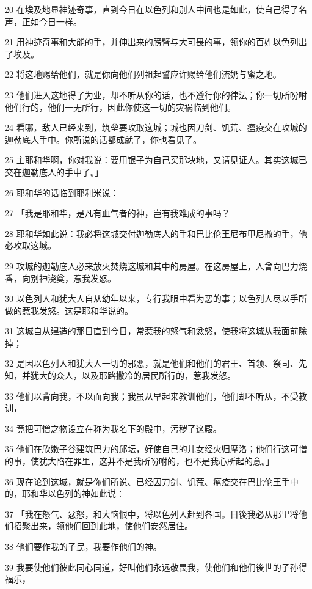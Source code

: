 \par 20 在埃及地显神迹奇事，直到今日在以色列和别人中间也是如此，使自己得了名声，正如今日一样。
\par 21 用神迹奇事和大能的手，并伸出来的膀臂与大可畏的事，领你的百姓以色列出了埃及。
\par 22 将这地赐给他们，就是你向他们列祖起誓应许赐给他们流奶与蜜之地。
\par 23 他们进入这地得了为业，却不听从你的话，也不遵行你的律法；你一切所吩咐他们行的，他们一无所行，因此你使这一切的灾祸临到他们。
\par 24 看哪，敌人已经来到，筑垒要攻取这城；城也因刀剑、饥荒、瘟疫交在攻城的迦勒底人手中。你所说的话都成就了，你也看见了。
\par 25 主耶和华啊，你对我说：要用银子为自己买那块地，又请见证人。其实这城已交在迦勒底人的手中了。」
\par 26 耶和华的话临到耶利米说：
\par 27 「我是耶和华，是凡有血气者的神，岂有我难成的事吗？
\par 28 耶和华如此说：我必将这城交付迦勒底人的手和巴比伦王尼布甲尼撒的手，他必攻取这城。
\par 29 攻城的迦勒底人必来放火焚烧这城和其中的房屋。在这房屋上，人曾向巴力烧香，向别神浇奠，惹我发怒。
\par 30 以色列人和犹大人自从幼年以来，专行我眼中看为恶的事；以色列人尽以手所做的惹我发怒。这是耶和华说的。
\par 31 这城自从建造的那日直到今日，常惹我的怒气和忿怒，使我将这城从我面前除掉；
\par 32 是因以色列人和犹大人一切的邪恶，就是他们和他们的君王、首领、祭司、先知，并犹大的众人，以及耶路撒冷的居民所行的，惹我发怒。
\par 33 他们以背向我，不以面向我；我虽从早起来教训他们，他们却不听从，不受教训，
\par 34 竟把可憎之物设立在称为我名下的殿中，污秽了这殿。
\par 35 他们在欣嫩子谷建筑巴力的邱坛，好使自己的儿女经火归摩洛；他们行这可憎的事，使犹大陷在罪里，这并不是我所吩咐的，也不是我心所起的意。」
\par 36 现在论到这城，就是你们所说、已经因刀剑、饥荒、瘟疫交在巴比伦王手中的，耶和华以色列的神如此说：
\par 37 「我在怒气、忿怒，和大恼恨中，将以色列人赶到各国。日後我必从那里将他们招聚出来，领他们回到此地，使他们安然居住。
\par 38 他们要作我的子民，我要作他们的神。
\par 39 我要使他们彼此同心同道，好叫他们永远敬畏我，使他们和他们後世的子孙得福乐，
